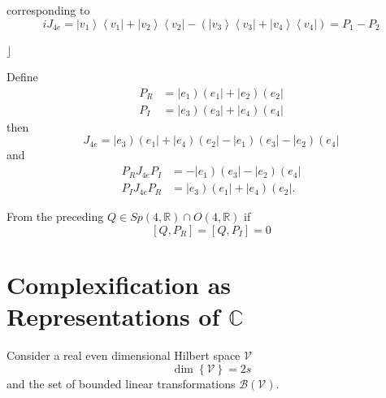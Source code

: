 \documentclass[aps,preprint]{revtex4}%
\begin{document}
corresponding to%
\begin{equation}
iJ_{4e}=\left\vert v_{1}\right\rangle \left\langle v_{1}\right\vert
+\left\vert v_{2}\right\rangle \left\langle v_{2}\right\vert -\left(
\left\vert v_{3}\right\rangle \left\langle v_{3}\right\vert +\left\vert
v_{4}\right\rangle \left\langle v_{4}\right\vert \right)  =P_{1}-P_{2}%
\end{equation}


$\rfloor$

Define
\begin{align}
P_{R}  &  =\left\vert e_{1}\right)  \left(  e_{1}\right\vert +\left\vert
e_{2}\right)  \left(  e_{2}\right\vert \\
P_{I}  &  =\left\vert e_{3}\right)  \left(  e_{3}\right\vert +\left\vert
e_{4}\right)  \left(  e_{4}\right\vert
\end{align}
then
\begin{equation}
J_{4e}=\left\vert e_{3}\right)  \left(  e_{1}\right\vert +\left\vert
e_{4}\right)  \left(  e_{2}\right\vert -\left\vert e_{1}\right)  \left(
e_{3}\right\vert -\left\vert e_{2}\right)  \left(  e_{4}\right\vert
\end{equation}
and%
\begin{align}
P_{R}J_{4e}P_{I}  &  =-\left\vert e_{1}\right)  \left(  e_{3}\right\vert
-\left\vert e_{2}\right)  \left(  e_{4}\right\vert \\
P_{I}J_{4e}P_{R}  &  =\left\vert e_{3}\right)  \left(  e_{1}\right\vert
+\left\vert e_{4}\right)  \left(  e_{2}\right\vert .
\end{align}


From the preceding $Q\in Sp\left(  4,\mathbb{R}\right)  \cap O\left(
4,\mathbb{R}\right)  $ if
\begin{equation}
\left[  Q,P_{R}\right]  =\left[  Q,P_{I}\right]  =0
\end{equation}


\section{Complexification as Representations of $\mathbb{C}$}

Consider a real even dimensional Hilbert space $\mathcal{V}$
\begin{equation}
\dim\left\{  \mathcal{V}\right\}  =2s
\end{equation}
and the set of bounded linear transformations $\mathcal{B}\left(
\mathcal{V}\right)  .$
\end{document}
